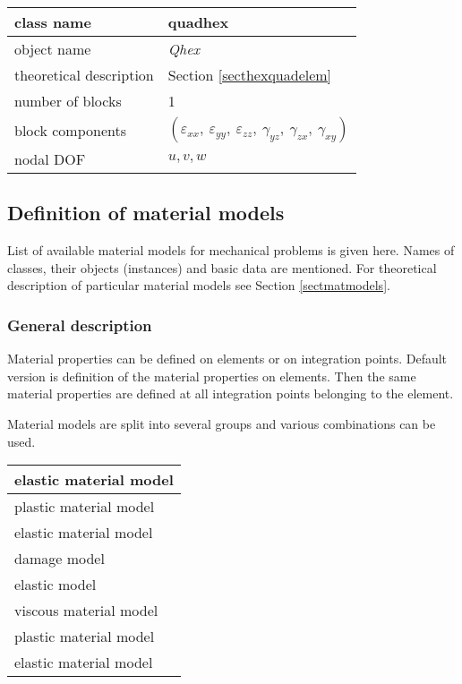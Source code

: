 \begin{center}
\begin{tabular}{|l|l|}
\hline
class name & {\sf quadhex}\index{class!{\sf quadhex}}
\\ \hline
object name & {\it Qhex}\index{instance!{\it Qhex}}
\\ \hline
theoretical description & Section \ref{secthexquadelem}
\\ \hline
number of blocks & 1
\\ \hline
block components & $(\varepsilon_{xx},\ \varepsilon_{yy},\ \varepsilon_{zz},\ \gamma_{yz},\ \gamma_{zx},\ \gamma_{xy})$
\\ \hline
nodal DOF & $u,v,w$
\\ \hline
\end{tabular}
\end{center}

\subsection{Definition of material models}

List of available material models for mechanical problems is given here. Names of classes, their objects
(instances) and basic data are mentioned. For theoretical description of particular material models
see Section \ref{sectmatmodels}.

\subsubsection{General description}

Material properties can be defined on elements or on integration points. Default
version is definition of the material properties on elements. Then the same material
properties are defined at all integration points belonging to the element.

Material models are split into several groups and various combinations can be used.

\begin{center}
\begin{tabular}{|l|}
\hline
elastic material model
\\ \hline
plastic material model
\\
elastic material model
\\ \hline
damage model
\\
elastic model
\\ \hline
viscous material model
\\
plastic material model
\\
elastic material model
\\ \hline
\end{tabular}
\end{center}

